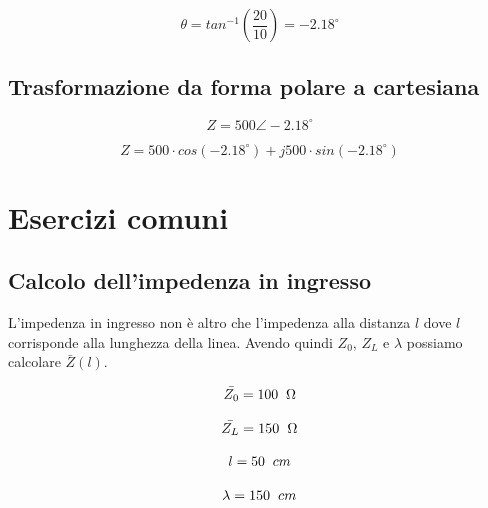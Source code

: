\documentclass{article}
\begin{document}
    \begin{equation}
        \theta = tan^{-1}(\frac{20}{10}) = -2.18^{\circ}
    \end{equation}

    \subsection{Trasformazione da forma polare a cartesiana}

    \begin{equation}
        Z = 500 \angle -2.18^{\circ}
    \end{equation}

    \begin{equation}
        Z = 500 \cdot cos(-2.18^{\circ}) + j 500 \cdot sin(-2.18^{\circ})
    \end{equation}

    \section{Esercizi comuni}

    \subsection{Calcolo dell'impedenza in ingresso}

    L'impedenza in ingresso non è altro che l'impedenza alla distanza $l$ dove $l$ corrisponde alla lunghezza della
    linea. Avendo quindi $Z_0$, $Z_L$ e $\lambda$ possiamo calcolare $\bar{Z}(l)$.

    \begin{equation*}
        \bar{Z_0} = 100 \hspace{0.2cm} \Omega
    \end{equation*}

    \begin{equation*}
        \bar{Z_L} = 150 \hspace{0.2cm} \Omega
    \end{equation*}

    \begin{equation*}
        l = 50 \hspace{0.2cm} cm
    \end{equation*}

    \begin{equation*}
        \lambda = 150 \hspace{0.2cm} cm
    \end{equation*}
\end{document}
